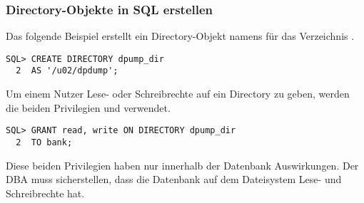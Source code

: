        \subsubsection{Directory-Objekte in SQL erstellen}
          Das folgende Beispiel erstellt ein Directory-Objekt namens
           für das Verzeichnis
          .
        \begin{lstlisting}[caption={Beispiel für \languageorasql{CREATE DIRECTORY}},label=admin900,language=oracle_sql]
SQL> CREATE DIRECTORY dpump_dir
  2  AS '/u02/dpdump';
          \end{lstlisting}
          Um einem Nutzer Lese- oder Schreibrechte auf ein Directory zu geben, werden die beiden Privilegien  und  verwendet.
          \begin{lstlisting}[caption={Zugriff auf ein Directory gewähren},label=grantondirectory,language=oracle_sql]
SQL> GRANT read, write ON DIRECTORY dpump_dir
  2  TO bank;
          \end{lstlisting}
          Diese beiden Privilegien haben nur innerhalb der Datenbank Auswirkungen. Der DBA muss sicherstellen, dass die Datenbank auf dem Dateisystem Lese- und Schreibrechte hat.
          \begin{literaturinternet}
            \item \cite{sthref4351}
          \end{literaturinternet}
